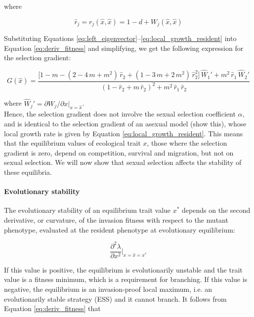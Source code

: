 where 

\begin{equation}
    \hat{r}_j = r_j(\hat{x}, \hat{x}) = 1 - d + W_j(\hat{x}, \hat{x})
    \label{eq:local_growth_resident}
\end{equation}

Substituting Equations \ref{eq:left_eigenvector}--\ref{eq:local_growth_resident} into Equation \ref{eq:deriv_fitness} and simplifying, we get the following expression for the selection gradient:

\begin{equation}
    G(\hat{x}) = \frac{\big[1-m-(2-4\,m+m^2)\,\hat{r}_2+(1-3\,m+2\,m^2)\,\hat{r}^2_2\big]\, \hat{W}_1' + m^2\,\hat{r}_1\,\hat{W}_2'}{(1-\hat{r}_2+m\,\hat{r}_2)^2 + m^2\,\hat{r}_1\,\hat{r}_2}
    \label{eq:fitness_gradient_expression}
\end{equation}

where $\hat{W}_j' = \partial W_j / \partial x |_{x = \hat{x}}$.\\

Hence, the selection gradient does not involve the sexual selection coefficient $\alpha$, and is identical to the selection gradient of an asexual model (show this), whose local growth rate is given by Equation \ref{eq:local_growth_resident}. This means that the equilibrium values of ecological trait $x$, those where the selection gradient is zero, depend on competition, survival and migration, but not on sexual selection. We will now show that sexual selection affects the stability of these equilibria.

\paragraph{Evolutionary stability} The evolutionary stability of an equilibrium trait value $x^*$ depends on the second derivative, or curvature, of the invasion fitness with respect to the mutant phenotype, evaluated at the resident phenotype at evolutionary equilibrium:

\begin{equation}
    \frac{\partial^2 \lambda}{\partial x^2}\bigg|_{x=\hat{x}=x^*}
\end{equation}

If this value is positive, the equilibrium is evolutionarily unstable and the trait value is a fitness minimum, which is a requirement for branching. If this value is negative, the equilibrium is an invasion-proof local maximum, i.e. an evolutionarily stable strategy (ESS) and it cannot branch. It follows from Equation \ref{eq:deriv_fitness} that

